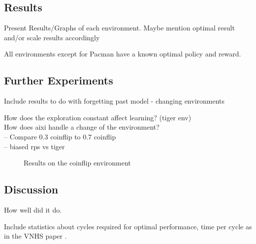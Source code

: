 \documentclass[paper=a4, fontsize=11pt]{scrartcl} %
\numberwithin{equation}{section} %
\numberwithin{figure}{section} %
\numberwithin{table}{section} %
\begin{document}
\subsection{Results}
Present Results/Graphs of each environment. Maybe mention optimal result and/or scale results accordingly

All environments except for Pacman have a known optimal policy and reward.

\subsection{Further Experiments}
Include results to do with forgetting past model - changing environments

How does the exploration constant affect learning? (tiger env)\\
How does aixi handle a change of the environment?\\
-- Compare 0.3 coinflip to 0.7 coinflip\\
-- biased rps vs tiger\\

\begin{figure}

\caption{\label{plot:coinflip}Results on the coinflip environment}
\end{figure}


\subsection{Discussion}
How well did it do.

Include statistics about cycles required for optimal performance, time per cycle as in the VNHS paper \cite{VNHS09}.




\end{document}
